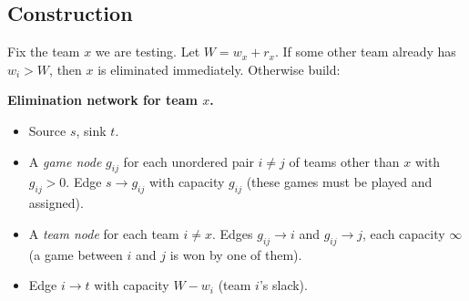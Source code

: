 \subsection{Construction}

Fix the team $x$ we are testing. Let $W = w_x + r_x$. If some other team already has $w_i > W$, then $x$ is eliminated immediately. Otherwise build:

\begin{focusbox}
\textbf{Elimination network for team $x$.}
\begin{itemize}
\item Source $s$, sink $t$.
\item A \emph{game node} $g_{ij}$ for each unordered pair $i\ne j$ of teams other than $x$ with $g_{ij}>0$. Edge $s\to g_{ij}$ with capacity $g_{ij}$ (these games must be played and assigned).
\item A \emph{team node} for each team $i\ne x$. Edges $g_{ij}\to i$ and $g_{ij}\to j$, each capacity $\infty$ (a game between $i$ and $j$ is won by one of them).
\item Edge $i\to t$ with capacity $W - w_i$ (team $i$'s slack).
\end{itemize}
\end{focusbox}

